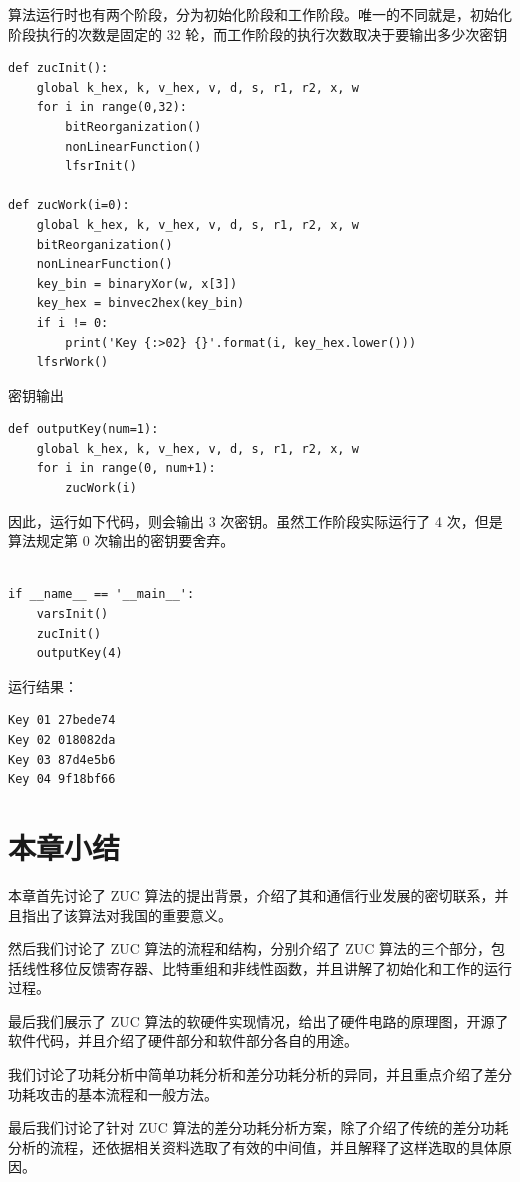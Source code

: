 算法运行时也有两个阶段，分为初始化阶段和工作阶段。唯一的不同就是，初始化阶段执行的次数是固定的 32 轮，而工作阶段的执行次数取决于要输出多少次密钥

\begin{lstlisting}[style=myPython,label={lst:zuc},caption={算法初始化阶段和工作阶段}]
def zucInit():
    global k_hex, k, v_hex, v, d, s, r1, r2, x, w
    for i in range(0,32):
        bitReorganization()
        nonLinearFunction()
        lfsrInit()

def zucWork(i=0):
    global k_hex, k, v_hex, v, d, s, r1, r2, x, w
    bitReorganization()
    nonLinearFunction()
    key_bin = binaryXor(w, x[3])
    key_hex = binvec2hex(key_bin)
    if i != 0:
        print('Key {:>02} {}'.format(i, key_hex.lower()))
    lfsrWork()
\end{lstlisting}

密钥输出

\begin{lstlisting}[style=myPython,label={lst:outputkey},caption={算法初始化阶段和工作阶段}]
def outputKey(num=1):
    global k_hex, k, v_hex, v, d, s, r1, r2, x, w
    for i in range(0, num+1):
        zucWork(i)

\end{lstlisting}

因此，运行如下代码，则会输出 3 次密钥。虽然工作阶段实际运行了 4 次，但是算法规定第 0 次输出的密钥要舍弃。

\begin{lstlisting}[style=myPython,label={lst:run},caption={完整的算法执行}]

if __name__ == '__main__':
    varsInit()
    zucInit()
    outputKey(4)

\end{lstlisting}

运行结果：

\begin{lstlisting}[style=myPython,label={lst:runresult},caption={运行结果}]
Key 01 27bede74
Key 02 018082da
Key 03 87d4e5b6
Key 04 9f18bf66
\end{lstlisting}



\section{本章小结}

本章首先讨论了 ZUC 算法的提出背景，介绍了其和通信行业发展的密切联系，并且指出了该算法对我国的重要意义。

然后我们讨论了 ZUC 算法的流程和结构，分别介绍了 ZUC 算法的三个部分，包括线性移位反馈寄存器、比特重组和非线性函数，并且讲解了初始化和工作的运行过程。

最后我们展示了 ZUC 算法的软硬件实现情况，给出了硬件电路的原理图，开源了软件代码，并且介绍了硬件部分和软件部分各自的用途。

我们讨论了功耗分析中简单功耗分析和差分功耗分析的异同，并且重点介绍了差分功耗攻击的基本流程和一般方法。

最后我们讨论了针对 ZUC 算法的差分功耗分析方案，除了介绍了传统的差分功耗分析的流程，还依据相关资料选取了有效的中间值，并且解释了这样选取的具体原因。
